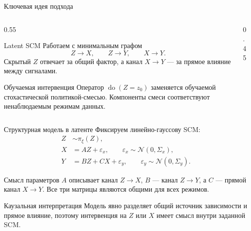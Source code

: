 \documentclass[19pt,pdf,hyperref={unicode}]{beamer}
\newcommand{\Normal}{\mathcal{N}}
\newcommand{\doop}{\operatorname{do}}
\begin{document}
\begin{frame}{Ключевая идея подхода}
\begin{columns}
\begin{column}{0.55\textwidth}
\begin{block}{Latent SCM}
Работаем с минимальным графом
\[
    Z \to X, \qquad Z \to Y, \qquad X \to Y.
\]
Скрытый $Z$ отвечает за общий фактор, а канал $X \to Y$ --- за прямое влияние между сигналами.
\end{block}

\begin{block}{Обучаемая интервенция}
Оператор $\doop(Z=z_0)$ заменяется обучаемой стохастической политикой-смесью. Компоненты смеси соответствуют ненаблюдаемым режимам данных.
\end{block}
\end{column}

\begin{column}{0.45\textwidth}
\centering
{}

\vspace{0.5cm}
\end{column}
\end{columns}
\end{frame}

\begin{frame}{Структурная модель в латенте}
Фиксируем линейно-гауссову SCM:
\[
\begin{aligned}
    Z &\sim \pi_\xi(Z), \\
    X &= A Z + \varepsilon_x, \qquad \varepsilon_x \sim \Normal(0, \Sigma_x), \\
    Y &= B Z + C X + \varepsilon_y, \qquad \varepsilon_y \sim \Normal(0, \Sigma_y).
\end{aligned}
\]

\begin{block}{Смысл параметров}
$A$ описывает канал $Z \to X$, $B$ --- канал $Z \to Y$, а $C$ --- прямой канал $X \to Y$. Все три матрицы являются общими для всех режимов.
\end{block}

\begin{block}{Каузальная интерпретация}
Модель явно разделяет общий источник зависимости и прямое влияние, поэтому интервенция на $Z$ или $X$ имеет смысл внутри заданной SCM.
\end{block}
\end{frame}
\end{document}
